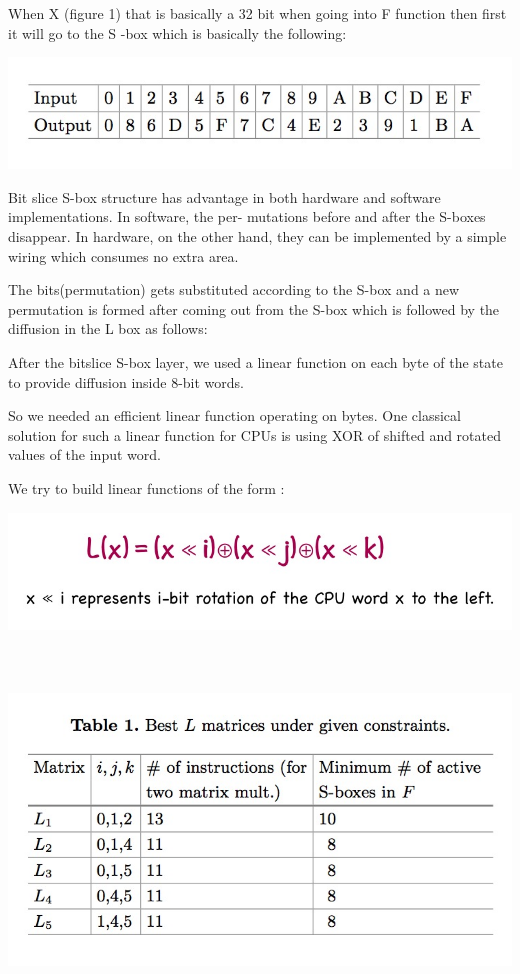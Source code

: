 When X (figure 1) that is basically a 32 bit when going into F function then first it will go to the S -box which is basically the following:

{\includegraphics[scale=0.6]{project/images/4.jpg}}

Bit slice S-box structure has advantage in both hardware and software implementations. In software, the per- mutations before and after the S-boxes disappear. In hardware, on the other hand, they can be implemented by a simple wiring which consumes no extra area. 

The bits(permutation) gets substituted according to the S-box and a new permutation is formed after coming out from the S-box which is followed by the diffusion in the L box as follows:

After the bitslice S-box layer, we used a linear function on each byte of the state to provide diffusion inside 8-bit words. 

So we needed an efficient linear function operating on bytes. One classical solution for such a linear function for CPUs is using XOR of shifted and rotated values of the input word. 

We try to build linear functions of the form :

\includegraphics[scale=0.5]{project/images/5.jpg}

\section*{\fontsize{20}{24}\selectfont{\color{red} {Key Addition:}}}\\

\includegraphics[scale=0.6]{project/images/6.jpg}

